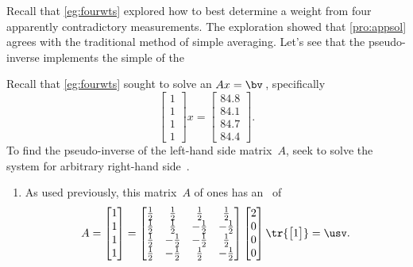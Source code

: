 \begin{example}  
Recall that \cref{eg:fourwts} explored how to best determine a  weight from four apparently contradictory measurements.
The exploration showed that \cref{pro:appsol} agrees with the traditional method of simple averaging.
Let's see that the pseudo-inverse implements the simple  of the 

Recall that \cref{eg:fourwts} sought to solve an  \(Ax=\bv\)\,, specifically
\begin{equation*}
\begin{bmatrix} 1\\1\\1\\1 \end{bmatrix}x
=\begin{bmatrix} 84.8\\84.1\\84.7\\84.4 \end{bmatrix}.
\end{equation*}
To find the pseudo-inverse of the left-hand side matrix~\(A\), seek to solve the system for arbitrary right-hand side~\bv.
\begin{enumerate}
\item As used previously, this matrix~\(A\) of ones has an \svd\ of
\def\h{\frac12}
\begin{equation*}
A=\begin{bmatrix} 1\\1\\1\\1 \end{bmatrix}
=\begin{bmatrix} \h&\h&\h&\h
\\\h&\h&-\h&-\h
\\\h&-\h&-\h&\h
\\\h&-\h&\h&-\h \end{bmatrix}
\begin{bmatrix} 2\\0\\0\\0 \end{bmatrix}
\tr{\begin{bmatrix} 1 \end{bmatrix}}
=\usv.
\end{equation*}


\end{enumerate}
\end{example}
